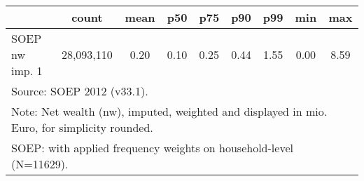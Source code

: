 {
\def\sym#1{\ifmmode^{#1}\else\(^{#1}\)\fi}
\begin{tabular}{l*{1}{cccccccc}}
\hline\hline
                                            &       count&        mean&         p50&         p75&         p90&         p99&         min&         max\\
\hline
SOEP nw imp. 1                              &  28,093,110&        0.20&        0.10&        0.25&        0.44&        1.55&        0.00&        8.59\\
\hline\hline
\multicolumn{9}{l}{\footnotesize Source: SOEP 2012 (v33.1).}\\
\multicolumn{9}{l}{\footnotesize Note: Net wealth (nw), imputed, weighted and displayed in mio. Euro, for simplicity rounded.}\\
\multicolumn{9}{l}{\footnotesize SOEP: with applied frequency weights on household-level (N=11629).}\\
\end{tabular}
}
